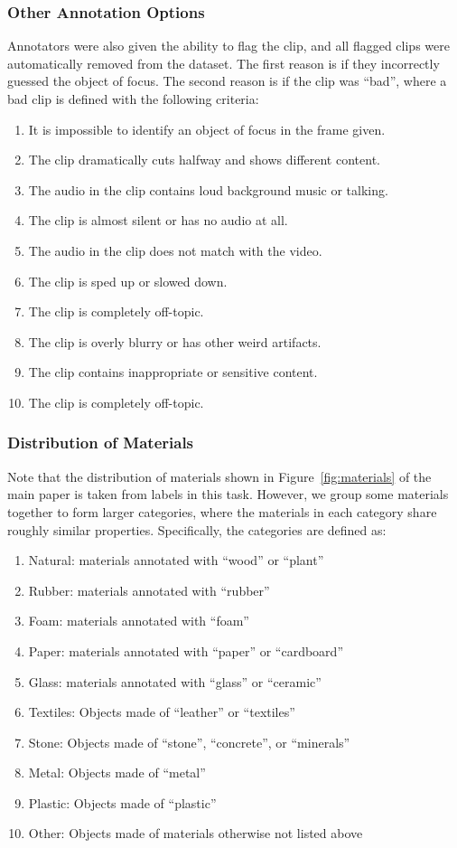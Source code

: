 \documentclass[runningheads]{llncs}
\begin{document}
\subsubsection{Other Annotation Options} Annotators were also given the ability to flag the clip, and all flagged clips were automatically removed from the dataset. The first reason is if they incorrectly guessed the object of focus. The second reason is if the clip was ``bad'', where a bad clip is defined with the following criteria:
\begin{enumerate}
    \item It is impossible to identify an object of focus in the frame given.
    \item The clip dramatically cuts halfway and shows different content.
    \item The audio in the clip contains loud background music or talking.
    \item The clip is almost silent or has no audio at all.
    \item The audio in the clip does not match with the video.
    \item The clip is sped up or slowed down.
    \item The clip is completely off-topic.
    \item The clip is overly blurry or has other weird artifacts.
    \item The clip contains inappropriate or sensitive content.
    \item The clip is completely off-topic.
\end{enumerate}

\subsubsection{Distribution of Materials}
Note that the distribution of materials shown in Figure~\ref{fig:materials} of the main paper is taken from labels in this task. However, we group some materials together to form larger categories, where the materials in each category share roughly similar properties. Specifically, the categories are defined as:
\begin{enumerate}
    \item Natural: materials annotated with ``wood'' or ``plant''
    \item Rubber: materials annotated with ``rubber''
    \item Foam: materials annotated with ``foam''
    \item Paper: materials annotated with ``paper'' or ``cardboard''
    \item Glass: materials annotated with ``glass'' or ``ceramic''
    \item Textiles: Objects made of ``leather'' or ``textiles''
    \item Stone: Objects made of ``stone'', ``concrete'', or ``minerals''
    \item Metal: Objects made of ``metal''
    \item Plastic: Objects made of ``plastic''
    \item Other: Objects made of materials otherwise not listed above
\end{enumerate}
\end{document}
